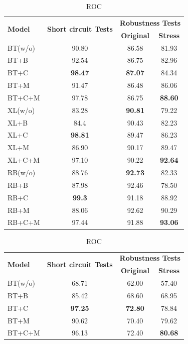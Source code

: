 \begin{table}[t!]
	\scriptsize
	\centering
	\begin{subtable}[t]{0.48\textwidth}
		\centering
		\begin{tabular}{l|c|cc}\toprule
			\multirow{2}{*}{\textbf{Model}}& \multirow{2}{*}{\bf Short circuit Tests} & \multicolumn{2}{c}{\bf Robustness Tests} \\ \cline{3-4}
			& & \textbf{Original} &\textbf{Stress}\\ \hline
			\rowcolor{Gray}
			BT(w/o)&90.80&86.58&81.93\\
			BT+B&92.54&86.75&82.96\\
			BT+C&\textbf{98.47}&\textbf{87.07}&84.34\\
			BT+M&91.47&86.48&86.06\\
			BT+C+M&97.78&86.75&\textbf{88.60}\\
			\midrule
			
			\rowcolor{Gray}
			XL(w/o)&83.28&\textbf{90.81}&79.22\\
			XL+B&84.4&90.43&82.23\\
			XL+C&\textbf{98.81}&89.47&86.23\\
			XL+M&86.90&90.17&89.47\\
			XL+C+M&97.10&90.22&\textbf{92.64}\\
			\midrule
			\rowcolor{Gray}
			RB(w/o)&88.76&\textbf{92.73}&82.33\\
			RB+B&87.98&92.46&78.50\\
			RB+C&\textbf{99.3}&91.18&88.92\\
			RB+M&88.06&92.62&90.29\\
			RB+C+M&97.44&91.88&\textbf{93.06}\\
			\bottomrule
		\end{tabular}
		\caption{ROC}
	\end{subtable} 
	\hfill
	\begin{subtable}[t]{0.48\textwidth}
		\centering
		\begin{tabular}{l|c|cc}\toprule
			\multirow{2}{*}{\textbf{Model}}& \multirow{2}{*}{\bf Short circuit Tests} & \multicolumn{2}{c}{\bf Robustness Tests} \\ \cline{3-4}
			& & \textbf{Original} &\textbf{Stress}\\ \hline
			\rowcolor{Gray}
			BT(w/o)&68.71&62.00&57.40\\
			BT+B&85.42&68.60&68.95\\
			BT+C&\textbf{97.25}&\textbf{72.80}&78.84\\
			BT+M&90.62&70.40&79.62\\
			BT+C+M&96.13&72.40&\textbf{80.68}\\
			\midrule
			

\end{tabular}
\end{subtable}
\end{table}

